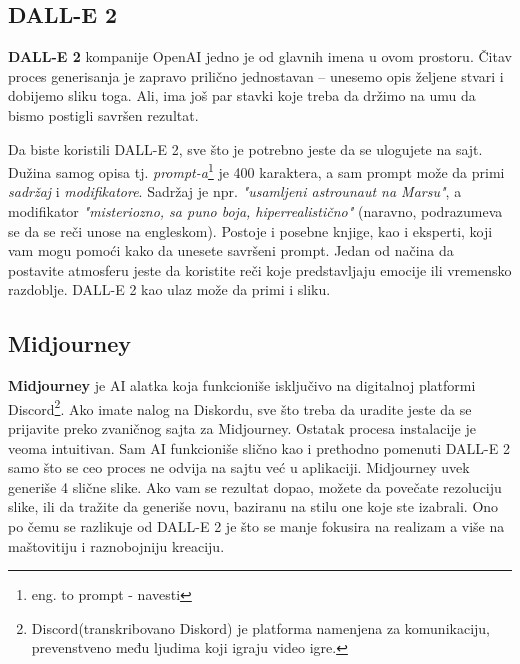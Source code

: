 \documentclass[12pt, letterpaper]{article}
\begin{document}
\subsection{DALL-E 2}
\textbf{DALL-E 2} kompanije OpenAI jedno je od glavnih imena u ovom prostoru. Čitav proces generisanja je zapravo prilično jednostavan – unesemo opis željene stvari i dobijemo sliku toga. Ali, ima još par stavki koje treba da držimo na umu da bismo postigli savršen rezultat.

Da biste koristili DALL-E 2, sve što je potrebno jeste da se ulogujete na sajt. Dužina samog opisa tj. \textit{prompt-a}\footnote{eng. to prompt - navesti} je 400 karaktera, a sam prompt može da primi \textit{sadržaj} i \textit{modifikatore}. Sadržaj je npr. \textit{"usamljeni astrounaut na Marsu"}, a modifikator \textit{"misteriozno, sa puno boja, hiperrealistično"} (naravno, podrazumeva se da se reči unose na engleskom). Postoje i posebne knjige\cite{Prompt}, kao i eksperti, koji vam mogu pomoći kako da unesete savršeni prompt. Jedan od načina da postavite atmosferu jeste da koristite reči koje predstavljaju emocije ili vremensko razdoblje. DALL-E 2 kao ulaz može da primi i sliku.
\subsection{Midjourney}
\textbf{Midjourney} je AI alatka koja funkcioniše isključivo na digitalnoj platformi Discord\footnote{Discord(transkribovano Diskord) je platforma namenjena za komunikaciju, prevenstveno među ljudima koji igraju video igre.}. Ako imate nalog na Diskordu, sve što treba da uradite jeste da se prijavite preko zvaničnog sajta za Midjourney. Ostatak procesa instalacije je veoma intuitivan. Sam  AI funkcioniše slično kao i prethodno pomenuti DALL-E 2 samo što se ceo proces ne odvija na sajtu već u aplikaciji. Midjourney uvek generiše 4 slične slike. Ako vam se rezultat dopao, možete da povečate rezoluciju slike, ili da tražite da generiše novu, baziranu na stilu one koje ste izabrali. Ono po čemu se razlikuje od DALL-E 2 je što se manje fokusira na realizam a više na maštovitiju i raznobojniju kreaciju.
\end{document}
